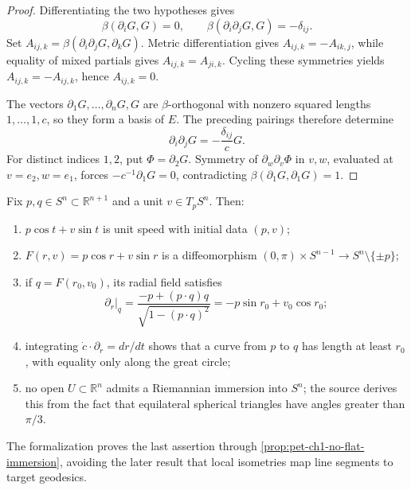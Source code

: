 \begin{proof}

  \sketch
  Differentiating the two hypotheses gives
  \[
    \beta(\partial_iG,G)=0,
    \qquad
    \beta(\partial_i\partial_jG,G)=-\delta_{ij}.
  \]
  Set $A_{ij,k}=\beta(\partial_i\partial_jG,\partial_kG)$. Metric
  differentiation gives $A_{ij,k}=-A_{ik,j}$, while equality of mixed partials
  gives $A_{ij,k}=A_{ji,k}$. Cycling these symmetries yields
  $A_{ij,k}=-A_{ij,k}$, hence $A_{ij,k}=0$.

  The vectors $\partial_1G,\ldots,\partial_nG,G$ are $\beta$-orthogonal with
  nonzero squared lengths $1,\ldots,1,c$, so they form a basis of $E$.
  The preceding pairings therefore determine
  \[
    \partial_i\partial_jG=-\frac{\delta_{ij}}cG.
  \]
  For distinct indices $1,2$, put $\Phi=\partial_2G$. Symmetry of
  $\partial_w\partial_v\Phi$ in $v,w$, evaluated at $v=e_2,w=e_1$, forces
  $-c^{-1}\partial_1G=0$, contradicting
  $\beta(\partial_1G,\partial_1G)=1$.
\end{proof}

\begin{remark}
  \label{rem:pet-ch1-ex-20}


  Fix $p,q\in S^n\subset\mathbb{R}^{n+1}$ and a unit
  $v\in T_pS^n$. Then:
  \begin{enumerate}
    \item $p\cos t+v\sin t$ is unit speed with initial data $(p,v)$;
    \item
      $F(r,v)=p\cos r+v\sin r$ is a diffeomorphism
      $(0,\pi)\times S^{n-1}\to S^n\setminus\{\pm p\}$;
    \item if $q=F(r_0,v_0)$, its radial field satisfies
      \[
        \partial_r|_q
          =\frac{-p+(p\cdot q)q}{\sqrt{1-(p\cdot q)^2}}
          =-p\sin r_0+v_0\cos r_0;
      \]
    \item integrating $\dot c\cdot\partial_r=dr/dt$ shows that a curve from
      $p$ to $q$ has length at least $r_0$, with equality only along the
      great circle;
    \item no open $U\subset\mathbb{R}^n$ admits a Riemannian immersion into
      $S^n$; the source derives this from the fact that equilateral spherical
      triangles have angles greater than $\pi/3$.
  \end{enumerate}
  The formalization proves the last assertion through
  \cref{prop:pet-ch1-no-flat-immersion}, avoiding the later result that local
  isometries map line segments to target geodesics.
\end{remark}

